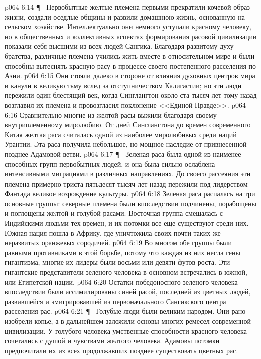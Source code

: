 \vs p064 6:14 \P\ \bibnobreakspace {} Первобытные желтые племена первыми прекратили кочевой образ жизни, создали оседлые общины и развили домашнюю жизнь, основанную на сельском хозяйстве. Интеллектуально они немного уступали красному человеку, но в общественных и коллективных аспектах формирования расовой цивилизации показали себя высшими из всех людей Сангика. Благодаря развитому духу братства, различные племена учились жить вместе в относительном мире и были способны вытеснять красную расу в процессе своего постепенного расселения по Азии.
\vs p064 6:15 Они стояли далеко в стороне от влияния духовных центров мира и канули в великую тьму вслед за отступничеством Калигастии; но эти люди пережили один блестящий век, когда Синглангтон около ста тысяч лет тому назад возглавил их племена и провозгласил поклонение <<Единой Правде>>.
\vs p064 6:16 Сравнительно многие из желтой расы выжили благодаря своему внутриплеменному миролюбию. От дней Синглангтона до времен современного Китая желтая раса считалась одной из наиболее миролюбивых среди наций Урантии. Эта раса получила небольшое, но мощное наследие от привнесенной позднее Адамовой ветви.
\vs p064 6:17 \P\ \bibnobreakspace {} Зеленая раса была одной из наименее способных групп первобытных людей, и она была сильно ослаблена интенсивными миграциями в различных направлениях. До своего рассеяния эти племена примерно триста пятьдесят тысяч лет назад пережили под лидерством Фантада великое возрождение культуры.
\vs p064 6:18 Зеленая раса распалась на три основные группы: северные племена были впоследствии подчинены, порабощены и поглощены желтой и голубой расами. Восточная группа смешалась с Индийскими людьми тех времен, и их потомки все еще существуют среди них. Южная нация пошла в Африку, где уничтожила своих почти таких же неразвитых оранжевых сородичей.
\vs p064 6:19 Во многом обе группы были равными противниками в этой борьбе, потому что каждая из них несла гены гигантизма, многие их лидеры были восьми или девяти футов роста. Эти гигантские представители зеленого человека в основном встречались в южной, или Египетской нации.
\vs p064 6:20 Остатки победоносного зеленого человека впоследствии были ассимилированы синей расой, последней из цветных людей, развившейся и эмигрировавшей из первоначального Сангикского центра расселения рас.
\vs p064 6:21 \P\ \bibnobreakspace {} Голубые люди были великим народом. Они рано изобрели копье, а в дальнейшем заложили основы многих ремесел современной цивилизации. У голубого человека умственные способности красного человека сочетались с душой и чувствами желтого человека. Адамовы потомки предпочитали их из всех продолжавших позднее существовать цветных рас.
